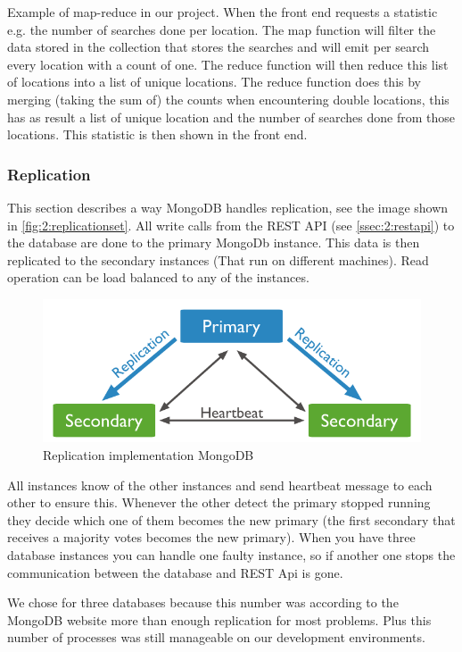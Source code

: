 Example of map-reduce in our project. When the front end requests a statistic e.g. the number of searches done per location. The map function will filter the data stored in the collection that stores the searches and will emit per search every location with a count of one. The reduce function will then reduce this list of locations into a list of unique locations. The reduce function does this by merging (taking the sum of) the counts when encountering double locations, this has as result a list of unique location and the number of searches done from those locations. This statistic is then shown in the front end.

\subsubsection{Replication}
\label{sssec:2:replication}
This section describes a way MongoDB handles replication, see the image shown in \autoref{fig:2:replicationset}. All write calls from the REST API (see \autoref{ssec:2:restapi}) to the database are done to the primary MongoDb instance. This data is then replicated to the secondary instances (That run on different machines). Read operation can be load balanced to any of the instances. 

\begin{figure}
\includegraphics[width=\textwidth]{./img/replica_set}   
\caption{Replication implementation MongoDB}
\label{fig:2:replicationset}
\end{figure}

All instances know of the other instances and send heartbeat message to each other to ensure this. Whenever the other detect the primary stopped running they decide which one of them becomes the new primary (the first secondary that receives a majority votes becomes the new primary). When you have three database instances you can handle one faulty instance, so if another one stops the communication between the database and REST Api is gone. 

We chose for three databases because this number was according to the MongoDB website more than enough replication for most problems. Plus this number of processes was still manageable on our development environments.

